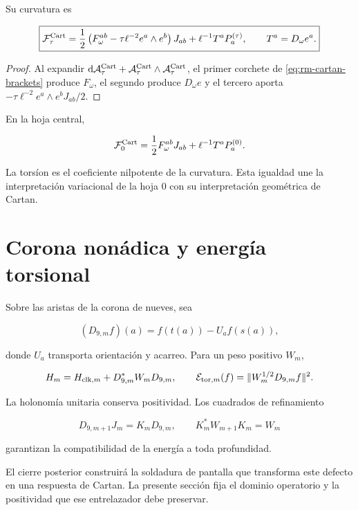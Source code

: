 Su curvatura es

\begin{equation}
\boxed{
\mathcal F_\tau^{\rm Cart}
=\frac12\left(F_\omega^{ab}-\tau\ell^{-2}e^a\wedge e^b\right)J_{ab}
+\ell^{-1}T^aP_a^{(\tau)},
\qquad T^a=D_\omega e^a.}
\label{eq:rm-trit-cartan-curvature}
\end{equation}

\begin{proof}
Al expandir
\(\mathrm d\mathcal A_\tau^{\rm Cart}
+\mathcal A_\tau^{\rm Cart}\wedge\mathcal A_\tau^{\rm Cart}\), el primer
corchete de \cref{eq:rm-cartan-brackets} produce \(F_\omega\), el segundo
produce \(D_\omega e\) y el tercero aporta
\(-\tau\ell^{-2}e^a\wedge e^bJ_{ab}/2\).
\end{proof}

En la hoja central,

\[
\mathcal F_0^{\rm Cart}
=\frac12F_\omega^{ab}J_{ab}+\ell^{-1}T^aP_a^{(0)}.
\]

La tors\'ion es el coeficiente nilpotente de la curvatura. Esta igualdad une
la interpretaci\'on variacional de la hoja \(0\) con su interpretaci\'on
geom\'etrica de Cartan.

\section{Corona non\'adica y energ\'ia torsional}

Sobre las aristas de la corona de nueves, sea

\[
(D_{9,m}f)(a)=f(t(a))-U_a f(s(a)),
\]

donde \(U_a\) transporta orientaci\'on y acarreo. Para un peso positivo \(W_m\),

\begin{equation}
H_m=H_{{\rm clk},m}+D_{9,m}^*W_mD_{9,m},
\qquad
\mathcal E_{{\rm tor},m}(f)
=\|W_m^{1/2}D_{9,m}f\|^2.
\label{eq:rm-nonadic-torsion-energy}
\end{equation}

La holonom\'ia unitaria conserva positividad. Los cuadrados de refinamiento

\[
D_{9,m+1}J_m=K_mD_{9,m},
\qquad
K_m^*W_{m+1}K_m=W_m
\]

garantizan la compatibilidad de la energ\'ia a toda profundidad.

El cierre posterior construir\'a la soldadura de pantalla que transforma este
defecto en una respuesta de Cartan. La presente secci\'on fija el dominio
operatorio y la positividad que ese entrelazador debe preservar.


